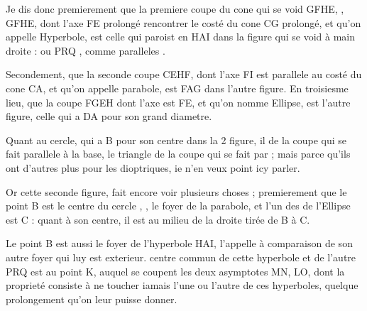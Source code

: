 \documentclass[11pt,a4paper]{article}
\begin{document}
Je dis donc premierement que la premiere coupe du cone qui se void \struck{\ill{}}  GFHE, ,  \ill{} GFHE, dont l'axe  FE prolongé  rencontrer  le costé du cone CG prolongé, \struck{\ill{}} et qu'on appelle Hyperbole, est celle qui paroist en HAI dans la figure qui se \struck{\ill{}} void à main droite : ou PRQ  ,  comme paralleles .

Secondement, que la seconde coupe CEHF, \struck{\ill{}} dont l'axe FI est parallele au costé du cone CA, et qu'on appelle \struck{\ill{}} parabole, est FAG dans l'autre figure. En troisiesme lieu, que la coupe FGEH dont l'axe est FE, et qu'on nomme Ellipse, est \struck{\ill{}} l'autre figure, celle \struck{\ill{}} qui a DA pour son grand diametre.

Quant au cercle, qui a B pour son centre dans la 2 figure, il  de la coupe \struck{\ill{}}   qui se fait parallele à la base,  le triangle  de la coupe qui se fait par   ; mais parce qu'ils ont d'autres  plus  pour les dioptriques, ie n'en veux point icy parler.

Or cette seconde figure,  \struck{\ill{} \ill{}} fait encore voir plusieurs choses  ; premierement que le point B est le centre du cercle ,     , le foyer de la parabole, et \struck{\ill{}} l'un des  de l'Ellipse \struck{\ill{}}  est C : quant à son centre, il est au milieu de la droite tirée de B à C.

Le point B est aussi le foyer de l'hyperbole HAI,  \ill{} l'appelle  à comparaison de son autre foyer  qui luy est exterieur.  \struck{\ill{}} centre commun de cette hyperbole et de l'autre  PRQ est au point K, auquel se coupent les deux asymptotes MN, LO, \struck{\ill{}} dont la proprieté consiste à ne toucher iamais l'une ou l'autre de ces hyperboles, quelque prolongement qu'on leur puisse donner.
\end{document}
